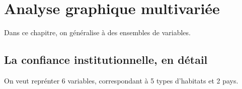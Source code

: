 \documentclass[
]{book}
\begin{document}
\hypertarget{analyse-graphique-multivariuxe9e}{%
\chapter{Analyse graphique multivariée}\label{analyse-graphique-multivariuxe9e}}

Dans ce chapitre, on généralise à des ensembles de variables.

\hypertarget{la-confiance-institutionnelle-en-duxe9tail}{%
\section{La confiance institutionnelle, en détail}\label{la-confiance-institutionnelle-en-duxe9tail}}

On veut reprénter 6 variables, correspondant à 5 types d'habitats et 2 pays.
\end{document}
